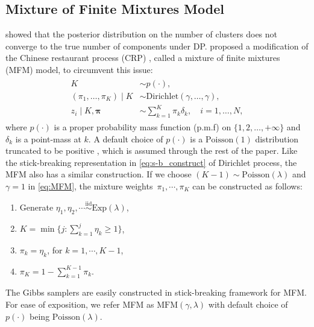 \documentclass[12pt]{article}
\newcommand{\abs}[1]{\left\vert#1\right\vert}
\begin{document}
\subsection{Mixture of Finite Mixtures Model}\label{sec:MFM}
 \cite{miller2013simple} showed that the
posterior distribution on the number of clusters does not converge to the true
number of components under DP. \cite{miller2018mixture} proposed a modification of the
Chinese restaurant process (CRP) \citep{pitman1995exchangeable}, called a mixture of finite mixtures (MFM) model, to circumvent this issue: 
\begin{eqnarray}\label{eq:MFM}
\begin{split}
K & \sim p(\cdot), \\
(\pi_1, \ldots, \pi_K) \mid K &\sim \text{Dirichlet}(\gamma, \ldots, \gamma), \\
 z_i \mid K, \bm{\pi} & \sim \sum_{k=1}^K  \pi_k \delta_k, \quad  i=1, \ldots, N, 
\end{split}
\end{eqnarray}
where $p(\cdot)$ is a proper probability mass function (p.m.f) on $\{1, 2,
\ldots, +\infty\}$ and $\delta_k$ is a
point-mass at $k$. A default choice of $p(\cdot)$ is a $\mbox{Poisson}(1)$
distribution truncated to be positive \citep{miller2018mixture}, which is
assumed through the rest of the paper. Like the stick-breaking representation
in \eqref{eq:s-b_construct} of Dirichlet process, the MFM also has a
similar construction. If we choose $(K-1) \sim \mbox{Poisson}(\lambda)$ and
$\gamma=1$ in \eqref{eq:MFM}, the mixture weights~$\pi_1,\cdots,\pi_K$ can be
constructed as follows:
\begin{enumerate}
	\item Generate $\eta_1,\eta_2,\cdots \overset{\text{iid}}{\sim}
\text{Exp}(\lambda)$,
	\item $K=\min\{j:\sum_{k=1}^j \eta_k \geq 1\}$,
	\item $\pi_k=\eta_k$, for $k=1,\cdots,K-1$,
	\item $\pi_K=1-\sum_{k=1}^{K-1}\pi_k$.
\end{enumerate}
The Gibbs samplers are easily constructed in stick-breaking framework \citep{ishwaran2001gibbs} for MFM. For ease of exposition, we refer MFM as $\text{MFM}(\gamma,\lambda)$ with default choice of $p(\cdot)$ being $\mbox{Poisson}(\lambda)$.
\end{document}
